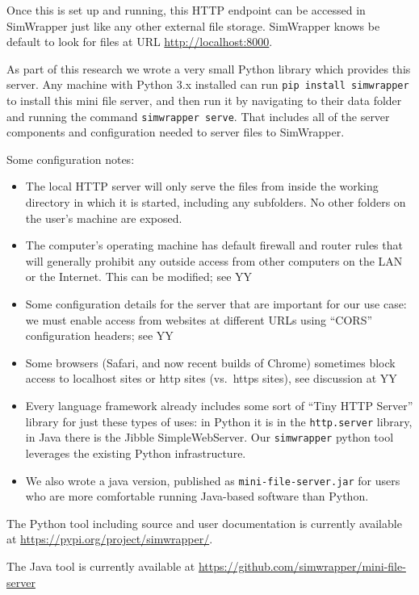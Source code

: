 \documentclass[3p,times,procedia]{elsarticle}
\begin{document}
Once this is set up and running, this HTTP endpoint can be accessed in
SimWrapper just like any other external file storage. SimWrapper knows
be default to look for files at URL \url{http://localhost:8000}.

As part of this research we wrote a very small Python library which
provides this server. Any machine with Python 3.x installed can run
\texttt{pip\ install\ simwrapper} to install this mini file server, and
then run it by navigating to their data folder and running the command
\texttt{simwrapper\ serve}. That includes all of the server components
and configuration needed to server files to SimWrapper.

Some configuration notes:

\begin{itemize}
\item
  The local HTTP server will only serve the files from inside the
  working directory in which it is started, including any subfolders. No
  other folders on the user's machine are exposed.
\item
  The computer's operating machine has default firewall and router rules
  that will generally prohibit any outside access from other computers
  on the LAN or the Internet. This can be modified; see YY
\item
  Some configuration details for the server that are important for our
  use case: we must enable access from websites at different URLs using
  ``CORS'' configuration headers; see YY
\item
  Some browsers (Safari, and now recent builds of Chrome) sometimes
  block access to localhost sites or http sites (vs.~https sites), see
  discussion at YY
\item
  Every language framework already includes some sort of ``Tiny HTTP
  Server'' library for just these types of uses: in Python it is in the
  \texttt{http.server} library, in Java there is the Jibble
  SimpleWebServer. Our \texttt{simwrapper} python tool leverages the
  existing Python infrastructure.
\item
  We also wrote a java version, published as
  \texttt{mini-file-server.jar} for users who are more comfortable
  running Java-based software than Python.
\end{itemize}

The Python tool including source and user documentation is currently
available at \url{https://pypi.org/project/simwrapper/}.

The Java tool is currently available at
\url{https://github.com/simwrapper/mini-file-server}
\end{document}
